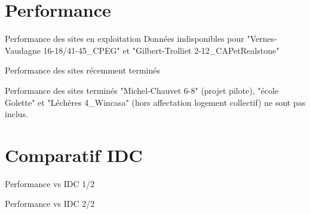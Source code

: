 \documentclass{beamer}
\begin{document}

\section{Performance}

\begin{frame}[t]{Performance des sites en exploitation}
	\vfill
	{\tiny Données indisponibles pour "Vernes-Vaudagne 16-18/41-45\_CPEG" et "Gilbert-Trolliet 2-12\_CAPetRealstone"}
\end{frame}

\begin{frame}[t]{Performance des sites récemment terminés}
\end{frame}

\begin{frame}[t]{Performance des sites terminés}
    \vfill
    {\tiny "Michel-Chauvet 6-8" (projet pilote), "école Golette" et "Léchères 4\_Wincasa" (hors affectation logement collectif) ne sont pas inclus.}
\end{frame}


\section{Comparatif IDC}

\begin{frame}[t]{Performance vs IDC 1/2}
\end{frame}

\begin{frame}[t]{Performance vs IDC 2/2}
\end{frame}
\end{document}
